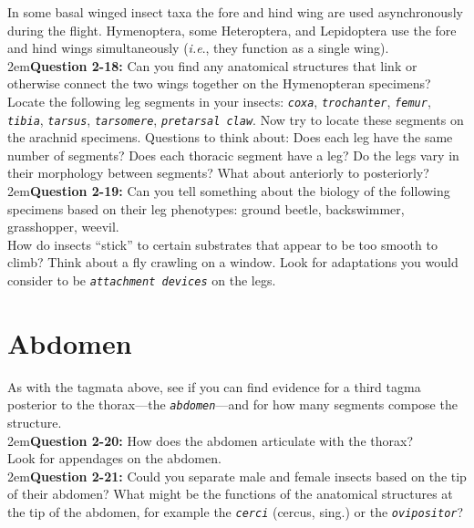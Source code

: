 \documentclass[letterpaper, 11pt]{article}
\newcommand{\latinword}[1]{\texttt{\itshape #1}}%
\begin{document}
\noindent{}In some basal winged insect taxa the fore and hind wing are used asynchronously during the flight. Hymenoptera, some Heteroptera, and Lepidoptera use the fore and hind wings simultaneously (\textit{i.e}., they function as a single wing). \\ 

\hangindent2em\textbf{Question 2-18:} Can you find any anatomical structures that link or otherwise connect the two wings together on the Hymenopteran specimens?\\

\noindent{}Locate the following leg segments in your insects: \latinword{coxa}, \latinword{trochanter}, \latinword{femur}, \latinword{tibia}, \latinword{tarsus}, \latinword{tarsomere}, \latinword{pretarsal claw}. Now try to locate these segments on the arachnid specimens. Questions to think about: Does each leg have the same number of segments? Does each thoracic segment have a leg? Do the legs vary in their morphology between segments? What about anteriorly to posteriorly?\\


\hangindent2em\textbf{Question 2-19:} Can you tell something about the biology of the following specimens based on their leg phenotypes: ground beetle, backswimmer, grasshopper, weevil.\\

\noindent{}How do insects ``stick'' to certain substrates that appear to be too smooth to climb? Think about a fly crawling on a window. Look for adaptations you would consider to be \latinword{attachment devices} on the legs.

\section{Abdomen}
As with the tagmata above, see if you can find evidence for a third tagma posterior to the thorax---the \latinword{abdomen}---and for how many segments compose the structure.\\

\hangindent2em\textbf{Question 2-20:} How does the abdomen articulate with the thorax?\\

\noindent{}Look for appendages on the abdomen. \\

\hangindent2em\textbf{Question 2-21:} Could you separate male and female insects based on the tip of their abdomen? What might be the functions of the anatomical structures at the tip of the abdomen, for example the \latinword{cerci} (cercus, sing.) or the \latinword{ovipositor}? \\
\end{document}
